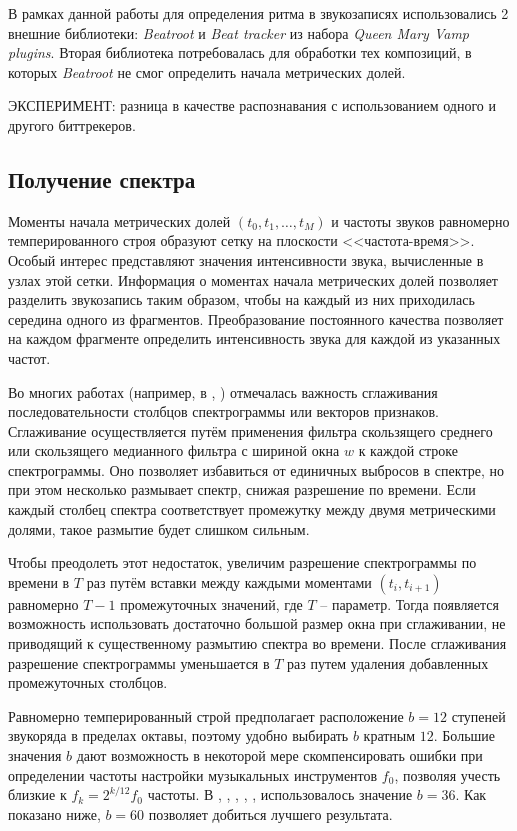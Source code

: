 В рамках данной работы для определения ритма в звукозаписях использовались 2
внешние библиотеки: \emph{Beatroot} \cite{Dixon2007} и \emph{Beat tracker}
\cite{Davies2007} из набора \emph{Queen Mary Vamp plugins}. Вторая библиотека
потребовалась для обработки тех композиций, в которых \emph{Beatroot} не
смог определить начала метрических долей.

ЭКСПЕРИМЕНТ: разница в качестве распознавания с использованием одного и другого
биттрекеров.

\subsection{Получение спектра} \label{ssect1_spectrum}

Моменты начала метрических долей $(t_0, t_1, \ldots, t_M)$ и частоты звуков
равномерно темперированного строя образуют сетку на плоскости
<<частота-время>>. Особый интерес представляют значения интенсивности звука,
вычисленные в узлах этой сетки. Информация о моментах начала метрических долей
позволяет разделить звукозапись таким образом, чтобы на каждый из них
приходилась середина одного из фрагментов. Преобразование постоянного качества
позволяет на каждом фрагменте определить интенсивность звука для каждой из
указанных частот.

Во многих работах (например, в \cite{Jiang2011}, \cite{Cho2011}) отмечалась
важность сглаживания последовательности столбцов спектрограммы или векторов
признаков. Сглаживание осуществляется путём применения фильтра скользящего
среднего или скользящего медианного фильтра с шириной окна $w$ к каждой строке
спектрограммы. Оно позволяет избавиться от единичных выбросов в спектре, но при
этом несколько размывает спектр, снижая разрешение по времени. Если каждый
столбец спектра соответствует промежутку между двумя метрическими долями, такое
размытие будет слишком сильным.

Чтобы преодолеть этот недостаток, увеличим разрешение спектрограммы по времени в
$T$ раз путём вставки между каждыми моментами $(t_i, t_{i+1})$ равномерно $T-1$
промежуточных значений, где $T$ -- параметр. Тогда появляется возможность
использовать достаточно большой размер окна при сглаживании, не приводящий к
существенному размытию спектра во времени. После сглаживания разрешение
спектрограммы уменьшается в $T$ раз путем удаления добавленных промежуточных
столбцов.

Равномерно темперированный строй предполагает расположение $b=12$ ступеней
звукоряда в пределах октавы, поэтому удобно выбирать $b$ кратным $12$. Большие
значения $b$ дают возможность в некоторой мере скомпенсировать ошибки при
определении частоты настройки музыкальных инструментов $f_0$, позволяя учесть
близкие к $f_k = 2^{k/12} f_0$ частоты. В \cite{Bello2005}, \cite{Lee2006},
\cite{Mauch2008}, \cite{Oudre2009}, \cite{Cho2010}, \cite{Cho2011}
использовалось значение $b=36$. Как показано ниже, $b=60$ позволяет добиться
лучшего результата.

